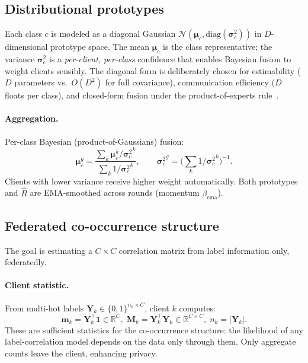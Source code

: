 \documentclass[10pt,twocolumn,letterpaper]{article}
\theoremstyle{definition}
\newcommand{\Rhat}{\widehat{R}}
\newcommand{\bc}{\boldsymbol{\mu}_c}
\newcommand{\sigc}{\boldsymbol{\sigma}_c^{2}}
\begin{document}
\subsection{Distributional prototypes}
\label{sec:protos}

Each class $c$ is modeled as a diagonal Gaussian $\mathcal{N}(\bc,\mathrm{diag}(\sigc))$ in $D$-dimensional prototype space. The mean $\bc$ is the class representative; the variance $\sigc$ is a \emph{per-client, per-class} confidence that enables Bayesian fusion to weight clients sensibly. The diagonal form is deliberately chosen for estimability ($D$ parameters vs.\ $O(D^{2})$ for full covariance), communication efficiency ($D$ floats per class), and closed-form fusion under the product-of-experts rule~\cite{hinton2002poe}.

\paragraph{Aggregation.} Per-class Bayesian (product-of-Gaussians) fusion:
\begin{equation}
\boldsymbol\mu_c^{g}=\frac{\sum_k \bc^{k}/{\sigc}^{k}}{\sum_k 1/{\sigc}^{k}},\qquad
{\sigc}^{g}=\Big(\sum_k 1/{\sigc}^{k}\Big)^{-1}.
\label{eq:bayesfusion}
\end{equation}
Clients with lower variance receive higher weight automatically. Both prototypes and $\Rhat$ are EMA-smoothed across rounds (momentum $\beta_{\text{ema}}$).

\subsection{Federated co-occurrence structure}
\label{sec:cooc}

The goal is estimating a $C{\times}C$ correlation matrix from label information only, federatedly.

\paragraph{Client statistic.} From multi-hot labels $\mathbf{Y}_k{\in}\{0,1\}^{n_k\times C}$, client $k$ computes:
\begin{equation}
\mathbf{m}_k=\mathbf{Y}_k^{\top}\mathbf{1}\in\mathbb{R}^{C},\;
\mathbf{M}_k=\mathbf{Y}_k^{\top}\mathbf{Y}_k\in\mathbb{R}^{C\times C},\;
n_k=|\mathbf{Y}_k|.
\label{eq:suffstat}
\end{equation}
These are sufficient statistics for the co-occurrence structure: the likelihood of any label-correlation model depends on the data only through them. Only aggregate counts leave the client, enhancing privacy.
\end{document}
